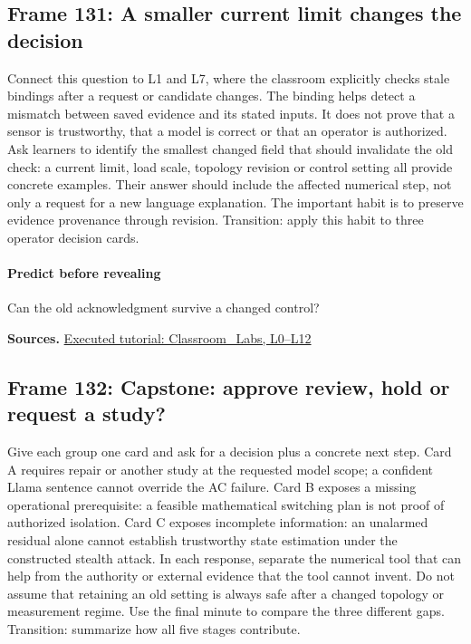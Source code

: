 \documentclass[11pt]{article}
\begin{document}
\subsection*{Frame 131: A smaller current limit changes the decision}
Connect this question to L1 and L7, where the classroom explicitly checks stale bindings after a request or candidate changes. The binding helps detect a mismatch between saved evidence and its stated inputs. It does not prove that a sensor is trustworthy, that a model is correct or that an operator is authorized. Ask learners to identify the smallest changed field that should invalidate the old check: a current limit, load scale, topology revision or control setting all provide concrete examples. Their answer should include the affected numerical step, not only a request for a new language explanation. The important habit is to preserve evidence provenance through revision. Transition: apply this habit to three operator decision cards.\par
\paragraph{Predict before revealing}Can the old acknowledgment survive a changed control?
\par\nopagebreak\begin{minipage}{\linewidth}{\footnotesize\color{slate}\textbf{Sources.} \href{../Classroom_Labs.html}{Executed tutorial: Classroom\_Labs, L0--L12}\par}\end{minipage}\par\medskip
\subsection*{Frame 132: Capstone: approve review, hold or request a study?}
Give each group one card and ask for a decision plus a concrete next step. Card A requires repair or another study at the requested model scope; a confident Llama sentence cannot override the AC failure. Card B exposes a missing operational prerequisite: a feasible mathematical switching plan is not proof of authorized isolation. Card C exposes incomplete information: an unalarmed residual alone cannot establish trustworthy state estimation under the constructed stealth attack. In each response, separate the numerical tool that can help from the authority or external evidence that the tool cannot invent. Do not assume that retaining an old setting is always safe after a changed topology or measurement regime. Use the final minute to compare the three different gaps. Transition: summarize how all five stages contribute.\par
\end{document}
